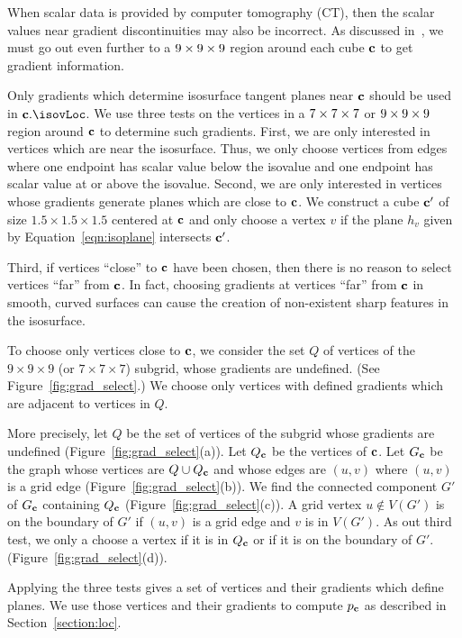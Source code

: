 When scalar data is provided by computer tomography (CT),
then the scalar values near gradient discontinuities
may also be incorrect.
As discussed in~\cite{bw-crgsd-15},
we must go out even further to a $9 \times 9 \times 9$ region 
around each cube $\mathbf{c}$ to get gradient information.

Only gradients which determine isosurface tangent planes near $\mathbf{c}$
should be used in $\cb.\isovLoc$.
We use three tests on the vertices in a $7 \times 7 \times 7$ or $9 \times 9 \times 9$
region around $\mathbf{c}$ to determine such gradients.
First, we are only interested in vertices which are near the isosurface.
Thus, we only choose vertices from edges
where one endpoint has scalar value below
the isovalue and one endpoint has scalar value at or above the isovalue.
Second, we are only interested in vertices whose gradients generate planes
which are close to $\mathbf{c}$.
We construct a cube $\mathbf{c}'$ of size $1.5 \times 1.5 \times 1.5$ centered at $\mathbf{c}$
and only choose a vertex $v$ 
if the plane $h_v$ given by Equation~\ref{eqn:isoplane}
intersects $\mathbf{c}'$.

Third, if vertices ``close'' to $\mathbf{c}$ have been chosen,
then there is no reason to select vertices ``far'' from $\mathbf{c}$.
In fact, choosing gradients at vertices ``far'' from $\mathbf{c}$
in smooth, curved surfaces can cause the creation 
of non-existent sharp features in the isosurface.

To choose only vertices close to $\mathbf{c}$,
we consider the set $Q$ of vertices 
of the $9 \times 9 \times 9$ (or $7 \times 7 \times 7$) subgrid,
whose gradients are undefined.
(See Figure~\ref{fig:grad_select}.)
We choose only vertices with defined gradients
which are adjacent to vertices in $Q$.

More precisely, let $Q$ be the set of vertices of the subgrid
whose gradients are undefined (Figure~\ref{fig:grad_select}(a)).
Let $Q_{\mathbf{c}}$ be the vertices of $\mathbf{c}$.
Let $G_{\mathbf{c}}$ be the graph whose vertices are $Q \cup Q_{\mathbf{c}}$
and whose edges are $(u,v)$ where $(u,v)$ is a grid edge
(Figure~\ref{fig:grad_select}(b)).
We find the connected component $G'$ of $G_{\mathbf{c}}$ containing $Q_{\mathbf{c}}$
(Figure~\ref{fig:grad_select}(c)).
A grid vertex $u \not\in V(G')$ is on the boundary of $G'$
if $(u,v)$ is a grid edge and $v$ is in $V(G')$.
As out third test, we only a choose a vertex if it is in $Q_{\mathbf{c}}$
or if it is on the boundary of $G'$.
(Figure~\ref{fig:grad_select}(d)).

Applying the three tests gives a set of vertices and their gradients
which define planes.
We use those vertices and their gradients to compute $p_{\mathbf{c}}$
as described in Section~\ref{section:loc}.


